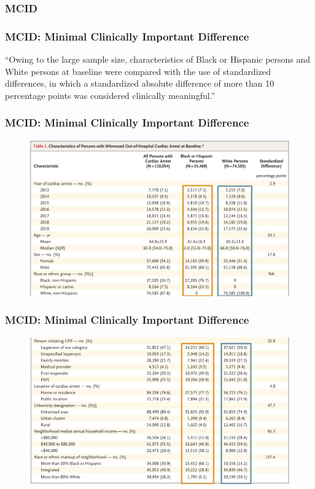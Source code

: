 \documentclass{beamer}
\begin{document}
		\subsubsection*{MCID}
			\begin{frame}
				\frametitle{MCID: Minimal Clinically Important Difference}
				``Owing to the large sample size, characteristics of Black or Hispanic persons and White persons at baseline were compared with the use of standardized differences, in which a standardized absolute difference of more than 10 percentage points was considered clinically meaningful.''
			\end{frame}
			\begin{frame}
				\frametitle{MCID: Minimal Clinically Important Difference}
				\begin{figure}
					\centering
					\includegraphics[width=1.0\linewidth]{img/table1-part1-boxed}
					\label{fig:table1-part1-boxed}
				\end{figure}
			\end{frame}
		\begin{frame}
			\frametitle{MCID: Minimal Clinically Important Difference}
			\begin{figure}
				\centering
				\includegraphics[width=1.0\linewidth]{img/table1-part2-boxed}
				\label{fig:table1-part2-boxed}
			\end{figure}
		\end{frame}
\end{document}
